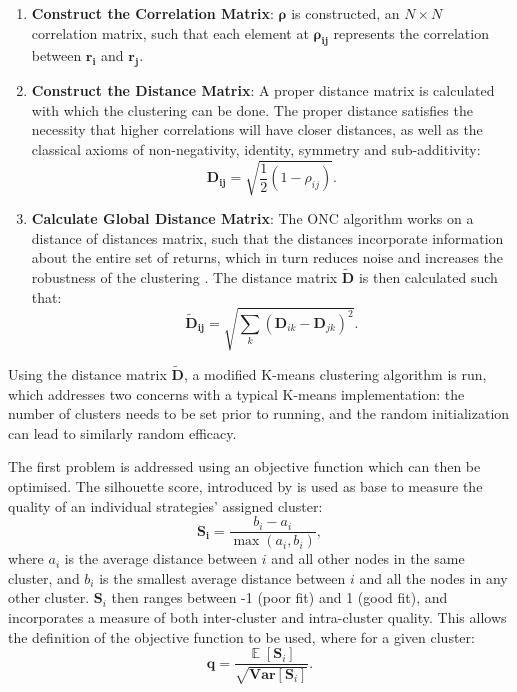 \documentclass[a4paper,11pt,oneside]{article}
\newcommand{\Var}{\mathbf{Var}}
\DeclareMathOperator*{\E}{\mathbb{E}}
\theoremstyle{plain}
\theoremstyle{definition}
\begin{document}
	\begin{enumerate}
		\item \textbf{Construct the Correlation Matrix}: $\mathbf{\rho}$ is constructed, an $N\times N$ correlation matrix, such that each element at $\mathbf{\rho_{ij}}$ represents the correlation between $\mathbf{r_i}$ and $\mathbf{r_j}$.
		\newline
		\item \textbf{Construct the Distance Matrix}: A proper distance matrix is calculated with which the clustering can be done. The proper distance satisfies the necessity that higher correlations will have closer distances, as well as the classical axioms of non-negativity, identity, symmetry and sub-additivity:
		\begin{equation}
			\mathbf{D_{ij}} = \sqrt{\frac{1}{2}\left(1 - \rho_{ij}\right)} .
		\end{equation} 
		\item \textbf{Calculate Global Distance Matrix}: The ONC algorithm works on a distance of distances matrix, such that the distances incorporate information about the entire set of returns, which in turn reduces noise and increases the robustness of the clustering \citep{LopezPrado2016a}. The distance matrix $\mathbf{\tilde{D}}$ is then calculated such that:
				\begin{equation}
				\mathbf{\tilde{D}_{ij}} = \sqrt{\sum_{k}\left(\mathbf{D}_{ik} - \mathbf{D}_{jk}\right)^2} .
				\end{equation} 
	\end{enumerate}
	
	Using the distance matrix $\mathbf{\tilde{D}}$, a modified K-means clustering algorithm is run, which addresses two concerns with a typical K-means implementation: the number of clusters needs to be set prior to running, and the random initialization can lead to similarly random efficacy. \newline
	
	The first problem is addressed using an objective function which can then be optimised. The silhouette score, introduced by \citet{Rousseeouw1987} is used as base to measure the quality of an individual strategies' assigned cluster:
	\begin{equation}\label{eq_silhouette}
	\mathbf{S_i} = \frac{b_i - a_i}{\mathrm{\max}\left(a_i, b_i\right)} ,
	\end{equation}
	where $a_i$ is the average distance between $i$ and all other nodes in the same cluster, and $b_i$ is the smallest average distance between $i$ and all the nodes in any other cluster. $\mathbf{S}_i$ then ranges between -1 (poor fit) and 1 (good fit), and incorporates a measure of both inter-cluster and intra-cluster quality. This allows the definition of the objective function to be used, where for a given cluster:
	\begin{equation}\label{eq_cluster_q}
	\mathbf{q} = \frac{\E[{\mathbf{S}_i}]}{\sqrt{\Var[{\mathbf{S}_i}]}} .
	\end{equation} 
	
\end{document}
